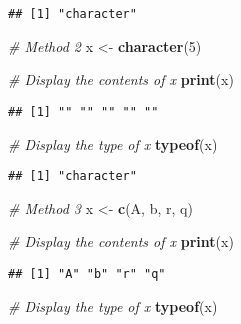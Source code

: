 \documentclass[
]{article}
\newenvironment{Shaded}{\begin{snugshade}}{\end{snugshade}}
\newcommand{\CommentTok}[1]{\textcolor[rgb]{0.56,0.35,0.01}{\textit{#1}}}
\newcommand{\DecValTok}[1]{\textcolor[rgb]{0.00,0.00,0.81}{#1}}
\newcommand{\FunctionTok}[1]{\textcolor[rgb]{0.13,0.29,0.53}{\textbf{#1}}}
\newcommand{\NormalTok}[1]{#1}
\newcommand{\OtherTok}[1]{\textcolor[rgb]{0.56,0.35,0.01}{#1}}
\newcommand{\StringTok}[1]{\textcolor[rgb]{0.31,0.60,0.02}{#1}}
\begin{document}
\begin{verbatim}
## [1] "character"
\end{verbatim}

\begin{Shaded}
\begin{Highlighting}[]
\CommentTok{\# Method 2}
\NormalTok{x }\OtherTok{\textless{}{-}} \FunctionTok{character}\NormalTok{(}\DecValTok{5}\NormalTok{)}

\CommentTok{\# Display the contents of x}
\FunctionTok{print}\NormalTok{(x)}
\end{Highlighting}
\end{Shaded}

\begin{verbatim}
## [1] "" "" "" "" ""
\end{verbatim}

\begin{Shaded}
\begin{Highlighting}[]
\CommentTok{\# Display the type of x}
\FunctionTok{typeof}\NormalTok{(x)}
\end{Highlighting}
\end{Shaded}

\begin{verbatim}
## [1] "character"
\end{verbatim}

\begin{Shaded}
\begin{Highlighting}[]
\CommentTok{\# Method 3}
\NormalTok{x }\OtherTok{\textless{}{-}} \FunctionTok{c}\NormalTok{(}\StringTok{\textquotesingle{}A\textquotesingle{}}\NormalTok{, }\StringTok{\textquotesingle{}b\textquotesingle{}}\NormalTok{, }\StringTok{\textquotesingle{}r\textquotesingle{}}\NormalTok{, }\StringTok{\textquotesingle{}q\textquotesingle{}}\NormalTok{)}

\CommentTok{\# Display the contents of x}
\FunctionTok{print}\NormalTok{(x)}
\end{Highlighting}
\end{Shaded}

\begin{verbatim}
## [1] "A" "b" "r" "q"
\end{verbatim}

\begin{Shaded}
\begin{Highlighting}[]
\CommentTok{\# Display the type of x}
\FunctionTok{typeof}\NormalTok{(x)}
\end{Highlighting}
\end{Shaded}
\end{document}
